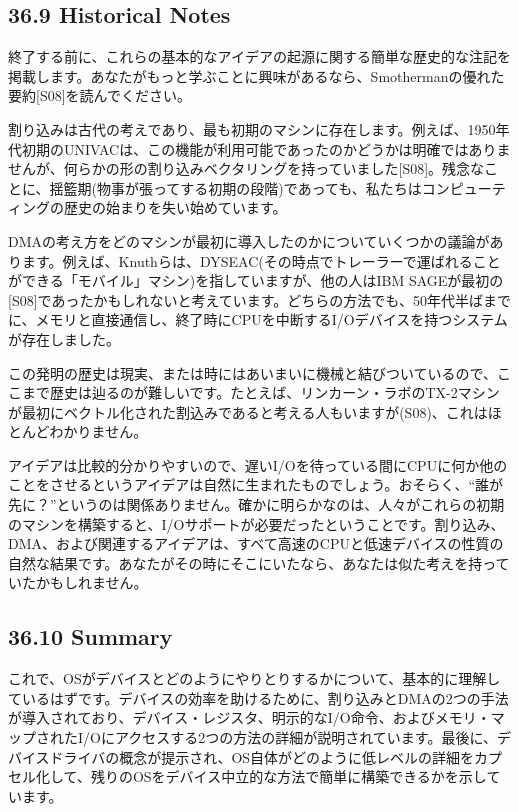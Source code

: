 \hypertarget{historical-notes}{%
\subsection*{36.9 Historical Notes}\label{historical-notes}}

終了する前に、これらの基本的なアイデアの起源に関する簡単な歴史的な注記を掲載します。あなたがもっと学ぶことに興味があるなら、Smothermanの優れた要約{[}S08{]}を読んでください。

割り込みは古代の考えであり、最も初期のマシンに存在します。例えば、1950年代初期のUNIVACは、この機能が利用可能であったのかどうかは明確ではありませんが、何らかの形の割り込みベクタリングを持っていました{[}S08{]}。残念なことに、揺籃期(物事が張ってする初期の段階)であっても、私たちはコンピューティングの歴史の始まりを失い始めています。

DMAの考え方をどのマシンが最初に導入したのかについていくつかの議論があります。例えば、Knuthらは、DYSEAC(その時点でトレーラーで運ばれることができる「モバイル」マシン)を指していますが、他の人はIBM
SAGEが最初の{[}S08{]}であったかもしれないと考えています。どちらの方法でも、50年代半ばまでに、メモリと直接通信し、終了時にCPUを中断するI/Oデバイスを持つシステムが存在しました。

この発明の歴史は現実、または時にはあいまいに機械と結びついているので、ここまで歴史は辿るのが難しいです。たとえば、リンカーン・ラボのTX-2マシンが最初にベクトル化された割込みであると考える人もいますが(S08)、これはほとんどわかりません。

アイデアは比較的分かりやすいので、遅いI/Oを待っている間にCPUに何か他のことをさせるというアイデアは自然に生まれたものでしょう。おそらく、``誰が先に？''というのは関係ありません。確かに明らかなのは、人々がこれらの初期のマシンを構築すると、I/Oサポートが必要だったということです。割り込み、DMA、および関連するアイデアは、すべて高速のCPUと低速デバイスの性質の自然な結果です。あなたがその時にそこにいたなら、あなたは似た考えを持っていたかもしれません。

\hypertarget{summary-23}{%
\subsection*{36.10 Summary}\label{summary-23}}

これで、OSがデバイスとどのようにやりとりするかについて、基本的に理解しているはずです。デバイスの効率を助けるために、割り込みとDMAの2つの手法が導入されており、デバイス・レジスタ、明示的なI/O命令、およびメモリ・マップされたI/Oにアクセスする2つの方法の詳細が説明されています。最後に、デバイスドライバの概念が提示され、OS自体がどのように低レベルの詳細をカプセル化して、残りのOSをデバイス中立的な方法で簡単に構築できるかを示しています。

